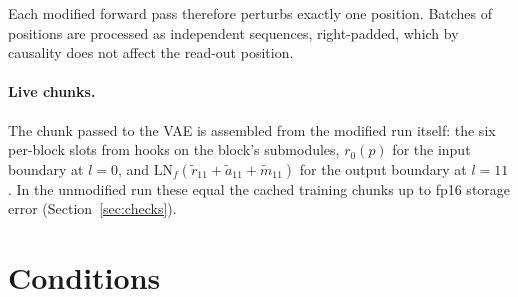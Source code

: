 \documentclass[11pt]{article}
\newcommand{\LN}{\mathrm{LN}}
\begin{document}
\noindent Each modified forward pass therefore perturbs exactly one position. Batches of positions are processed as
independent sequences, right-padded, which by causality does not affect the read-out position.

\paragraph{Live chunks.} The chunk passed to the VAE is assembled from the modified run itself: the six per-block slots
from hooks on the block's submodules, $r_0(p)$ for the input boundary at $l = 0$, and
$\LN_f(\tilde r_{11} + \tilde a_{11} + \tilde m_{11})$ for the output boundary at $l = 11$. In the unmodified run these
equal the cached training chunks up to fp16 storage error (Section~\ref{sec:checks}).

\section{Conditions}
\label{sec:conditions}
\end{document}
